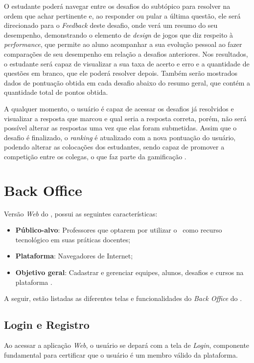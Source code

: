 O estudante poderá navegar entre os desafios do subtópico para resolver na ordem que achar pertinente e, ao responder ou pular a última questão, ele será direcionado para o \textit{Feedback} deste desafio, onde verá um resumo do seu desempenho, demonstrando o elemento de \textit{design} de jogos que diz respeito à \textit{performance}, que permite ao aluno acompanhar a sua evolução pessoal ao fazer comparações de seu desempenho em relação a desafios anteriores. Nos resultados, o estudante será capaz de visualizar a sua taxa de acerto e erro e a quantidade de questões em branco, que ele poderá resolver depois. Também serão mostrados dados de pontuação obtida em cada desafio abaixo do resumo geral, que contém a quantidade total de pontos obtida.

A qualquer momento, o usuário é capaz de acessar os desafios já resolvidos e visualizar a resposta que marcou e qual seria a resposta correta, porém, não será possível alterar as respostas uma vez que elas foram submetidas. Assim que o desafio é finalizado, o \textit{ranking} é atualizado com a nova pontuação do usuário, podendo alterar as colocações dos estudantes, sendo capaz de promover a competição entre os colegas, o que faz parte da gamificação \cite{ranking_competition}.

\section{Back Office}
\label{backoffice}

Versão \textit{Web} do \appName, possui as seguintes características:

\begin{itemize}
    \item \textbf{Público-alvo}: Professores que optarem por utilizar o \appName\ como recurso tecnológico em suas práticas docentes;
    \item \textbf{Plataforma}: Navegadores de Internet;
    \item \textbf{Objetivo geral}: Cadastrar e gerenciar equipes, alunos, desafios e cursos na plataforma \appName .
\end{itemize}

A seguir, estão listadas as diferentes telas e funcionalidades do \textit{Back Office} do \appName.

\subsection{Login e Registro}
Ao acessar a aplicação \textit{Web}, o usuário se depará com a tela de \textit{Login}, componente fundamental para certificar que o usuário é um membro válido da plataforma.

